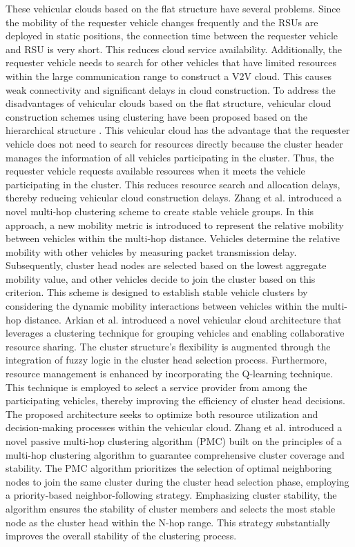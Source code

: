 \documentclass[sensors,article,accept,moreauthors,pdftex]{Definitions/mdpi}
\begin{document}
These vehicular clouds based on the flat structure have several problems. Since the mobility of the requester vehicle changes frequently and the RSUs are deployed in static positions, the connection time between the requester vehicle and RSU is very short. This reduces cloud service availability. Additionally, the requester vehicle needs to search for other vehicles that have limited resources within the large communication range to construct a V2V cloud. This causes weak connectivity and significant delays in cloud construction.
To address the disadvantages of vehicular clouds based on the flat structure, vehicular cloud construction schemes using clustering have been proposed based on the hierarchical structure \cite{Zhang2011, Arkian2014, Meneguette2017a, Zhang2019, Wu2019}. This vehicular cloud has the advantage that the requester vehicle does not need to search for resources directly because the cluster header manages the information of all vehicles participating in the cluster. Thus, the requester vehicle requests available resources when it meets the vehicle participating in the cluster. This reduces resource search and allocation delays, thereby reducing vehicular cloud construction delays.
Zhang et al. \cite{Zhang2011} introduced a novel multi-hop clustering scheme to create stable vehicle groups. In this approach, a new mobility metric is introduced to represent the relative mobility between vehicles within the multi-hop distance. Vehicles determine the relative mobility with other vehicles by measuring packet transmission delay. Subsequently, cluster head nodes are selected based on the lowest aggregate mobility value, and other vehicles decide to join the cluster based on this criterion. This scheme is designed to establish stable vehicle clusters by considering the dynamic mobility interactions between vehicles within the multi-hop distance.
Arkian et al. \cite{Arkian2014} introduced a novel vehicular cloud architecture that leverages a clustering technique for grouping vehicles and enabling collaborative resource sharing. The cluster structure's flexibility is augmented through the integration of fuzzy logic in the cluster head selection process. Furthermore, resource management is enhanced by incorporating the Q-learning technique. This technique is employed to select a service provider from among the participating vehicles, thereby improving the efficiency of cluster head decisions. The proposed architecture seeks to optimize both resource utilization and decision-making processes within the vehicular cloud.
Zhang et al. \cite{Zhang2019} introduced a novel passive multi-hop clustering algorithm (PMC) built on the principles of a multi-hop clustering algorithm to guarantee comprehensive cluster coverage and stability. The PMC algorithm prioritizes the selection of optimal neighboring nodes to join the same cluster during the cluster head selection phase, employing a priority-based neighbor-following strategy. Emphasizing cluster stability, the algorithm ensures the stability of cluster members and selects the most stable node as the cluster head within the N-hop range. This strategy substantially improves the overall stability of the clustering process.
\end{document}
